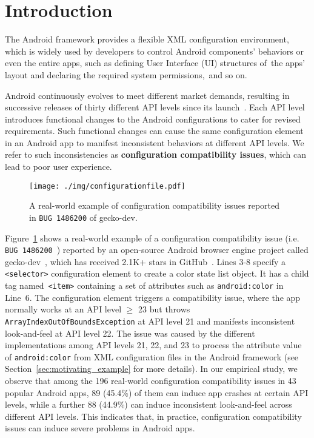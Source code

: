 
\section{Introduction}
\label{sec:1}

The Android framework provides a flexible XML configuration environment, which is widely used by developers to control Android components' behaviors or even the entire apps, such as defining User Interface (UI) structures of~the apps' layout and declaring the required system permissions,~and so on.

Android continuously evolves to meet different market demands, resulting in
successive releases of thirty
different API
levels since its launch~\cite{androiddevelopers}.
Each API level introduces functional changes to the Android configurations to cater for revised requirements.
Such functional changes can cause the same configuration element in an Android
app to manifest inconsistent behaviors at different API levels. We refer to
such inconsistencies as \textbf{configuration compatibility issues}, which can
lead to poor user experience.
\begin{figure}[t]
	\centering
	\texttt{[image: ./img/configurationfile.pdf]}
	\caption{
		{A real-world example of configuration compatibility issues reported in \texttt{BUG 1486200} of gecko-dev.}}
	\label{fig:configurationfile}
\end{figure}

Figure~\ref{fig:configurationfile} shows a real-world example of a configuration compatibility issue (i.e. \texttt{BUG 1486200}~\cite{geckoissue}) reported by an open-source Android browser engine project called gecko-dev~\cite{gecko}, which has received 2.1K+ stars in GitHub~\cite{github}.
Lines 3-8 specify a \texttt{<selector>} configuration element to create a color
state list object.
It has a child tag named~\texttt{<item>} containing a set of attributes
such as \texttt{android:color} in Line~6.
{The configuration element triggers a compatibility issue, where the app normally works at an API level $\geq$ 23 but throws \texttt{ArrayIndexOutOfBoundsException} at API level 21 and manifests inconsistent look-and-feel at API level 22. The issue was caused by the different implementations among API levels 21, 22, and 23 to process the attribute value of \texttt{android:color} from XML configuration files in the Android framework (see Section~\ref{sec:motivating_example} for more details).}
In our empirical study, we observe that among the 196 real-world configuration
compatibility issues in 43 popular Android apps, 89 (45.4\%) of them can induce app crashes at certain API levels, while a further 88 (44.9\%) can induce inconsistent look-and-feel across different
API levels. This indicates that, in practice, configuration compatibility issues can induce severe problems in Android apps.

